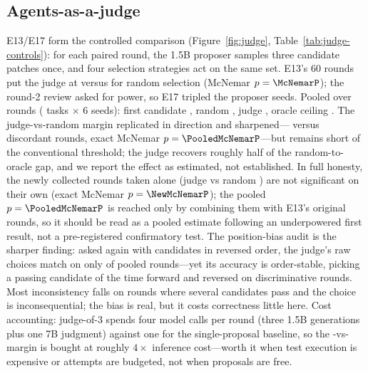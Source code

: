 \documentclass[11pt]{article}
\begin{document}
\subsection{Agents-as-a-judge}\label{sec:judge-results}
E13/E17 form the controlled comparison (Figure~\ref{fig:judge},
Table~\ref{tab:judge-controls}): for each paired round, the 1.5B proposer
samples three candidate patches once, and four selection strategies
act on the same set. E13's 60 rounds put the judge at \CtrlJudge{} versus
\CtrlRandom{} for random selection (McNemar $p=\McNemarP$); the round-2
review asked for power, so E17 tripled the proposer seeds. Pooled over
\PooledRounds{} rounds (\NumTasks{} tasks $\times$ 6 seeds): first candidate
\PooledFirst, random \PooledRandom, judge \PooledJudge, oracle ceiling
\PooledOracle. The judge-vs-random margin replicated in direction and
sharpened---\PooledMcNemarB{} versus \PooledMcNemarC{} discordant rounds,
exact McNemar $p=\PooledMcNemarP$---but remains short of the conventional
threshold; the judge recovers roughly half of the random-to-oracle gap, and
we report the effect as estimated, not established. In full honesty, the
\NewRounds{} newly collected rounds taken alone (judge \NewJudge{} vs
random \NewRandom) are not significant on their own (exact McNemar
$p=\NewMcNemarP$); the pooled $p=\PooledMcNemarP$ is reached only by combining
them with E13's original rounds, so it should be read as a pooled estimate
following an underpowered first result, not a pre-registered confirmatory test.
The position-bias audit
is the sharper finding: asked again with candidates in reversed order, the
judge's raw choices match on only \PooledConsistency{} of pooled rounds---yet
its accuracy is order-stable, picking a passing candidate
\PooledFwdAcc{} of the time forward and \PooledRevAcc{} reversed on
discriminative rounds. Most inconsistency falls on rounds where several
candidates pass and the choice is inconsequential; the bias is real, but it
costs correctness little here. Cost accounting: judge-of-3 spends four model
calls per round (three 1.5B generations plus one 7B judgment) against one for
the single-proposal baseline, so the \PooledJudge-vs-\PooledFirst{} margin is
bought at roughly $4\times$ inference cost---worth it when test execution is
expensive or attempts are budgeted, not when proposals are free.
\end{document}

